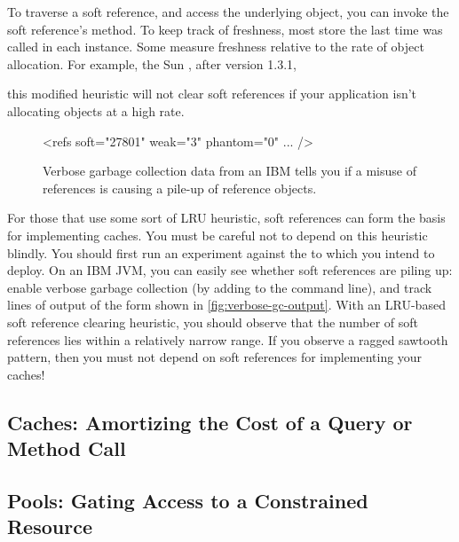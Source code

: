 To traverse a soft reference, and access the underlying object, you can invoke
the soft reference's  method. To keep track of freshness, most \jres
store the last time  was called in each 
instance. Some \jres measure freshness relative to the rate of
object allocation. For example, the Sun \jres, after version 1.3.1, 

 this modified heuristic will not clear soft references if
your application isn't allocating objects at a high rate.

\begin{wrapfigure}[8]{l}{0.395\textwidth}
\centering
\begin{framedlisting}
<refs soft="27801" weak="3" phantom="0" ... />
\end{framedlisting}
\caption{Verbose garbage collection data from an IBM \jre tells you
if a misuse of references is causing a pile-up of reference objects.}
\label{fig:verbose-gc-output}
\end{wrapfigure}
For those \jres that use some sort of LRU heuristic, soft references can form the
basis for implementing caches. You must be careful not to depend on this
heuristic blindly. You should first run an experiment against the \jre to which
you intend to deploy. On an IBM JVM, you can easily see whether soft references
are piling up: enable verbose
garbage collection (by adding  to the
command line), and track lines of output of the form shown in
\autoref{fig:verbose-gc-output}. With an LRU-based soft reference clearing
heuristic, you should observe that the number of soft references lies
within a relatively narrow range. If you
observe a ragged sawtooth pattern, then you must not
depend on soft references for implementing your caches!




\subsection{Caches: Amortizing the Cost of a Query or Method Call}

\subsection{Pools: Gating Access to a Constrained Resource}

